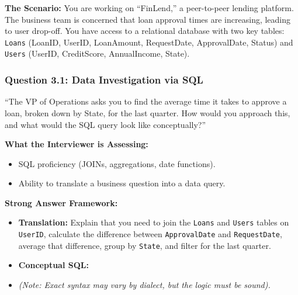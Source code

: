 \textbf{The Scenario:} You are working on ``FinLend,'' a peer-to-peer
lending platform. The business team is concerned that loan approval
times are increasing, leading to user drop-off. You have access to a
relational database with two key tables: \texttt{Loans} (LoanID, UserID,
LoanAmount, RequestDate, ApprovalDate, Status) and \texttt{Users}
(UserID, CreditScore, AnnualIncome, State).

\subsubsection{Question 3.1: Data Investigation via
SQL}\label{question-3.1-data-investigation-via-sql}

``The VP of Operations asks you to find the average time it takes to
approve a loan, broken down by State, for the last quarter. How would
you approach this, and what would the SQL query look like
conceptually?''

\textbf{What the Interviewer is Assessing:}

\begin{itemize}
\tightlist
\item
  SQL proficiency (JOINs, aggregations, date functions).
\item
  Ability to translate a business question into a data query.
\end{itemize}

\textbf{Strong Answer Framework:}

\begin{itemize}
\item
  \textbf{Translation:} Explain that you need to join the \texttt{Loans}
  and \texttt{Users} tables on \texttt{UserID}, calculate the difference
  between \texttt{ApprovalDate} and \texttt{RequestDate}, average that
  difference, group by \texttt{State}, and filter for the last quarter.
\item
  \textbf{Conceptual SQL:}

\begin{Shaded}
\begin{Highlighting}[]
\OperatorTok{=}
\OperatorTok{=}  
  \OperatorTok{\textgreater{}=}  \OperatorTok{\textless{}=} 
 
\end{Highlighting}
\end{Shaded}
\item
  \emph{(Note: Exact syntax may vary by dialect, but the logic must be
  sound).}
\end{itemize}

